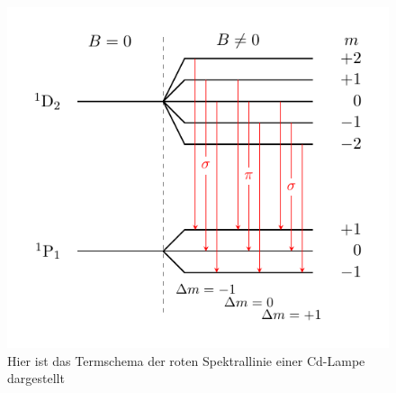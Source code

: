 \begin{figure}[!h]
\centering
\includegraphics[scale=1.15]{termschema_rot.pdf}
\caption{Hier ist das Termschema der roten Spektrallinie einer Cd-Lampe dargestellt\label{fig:termschema_rot}}
\end{figure}

